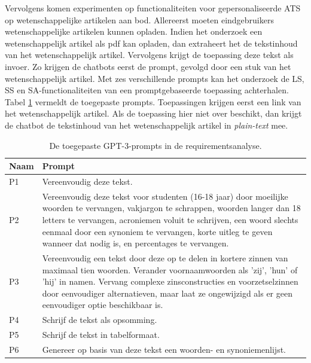 Vervolgens komen experimenten op functionaliteiten voor gepersonaliseerde ATS op wetenschappelijke artikelen aan bod. Allereerst moeten eindgebruikers wetenschappelijke artikelen kunnen opladen. Indien het onderzoek een wetenschappelijk artikel als pdf kan opladen, dan extraheert het de tekstinhoud van het wetenschappelijk artikel. Vervolgens krijgt de toepassing deze tekst als invoer. Zo krijgen de chatbots eerst de prompt, gevolgd door een stuk van het wetenschappelijk artikel. Met zes verschillende prompts kan het onderzoek de LS, SS en SA-functionaliteiten van een promptgebaseerde toepassing achterhalen. Tabel \ref{table:tested-prompts-requirementsanalysis} vermeldt de toegepaste prompts. Toepassingen krijgen eerst een link van het wetenschappelijk artikel. Als de toepassing hier niet over beschikt, dan krijgt de chatbot de tekstinhoud van het wetenschappelijk artikel in \textit{plain-text} mee. 

\begin{center}
	\begin{table}[H]
		\begin{tabular}{ | m{2cm} | m{14cm} | } 
			\hline
			\textbf{Naam} & \textbf{Prompt} \\
			\hline
			P1 & Vereenvoudig deze tekst. \\
			\hline
			P2 & Vereenvoudig deze tekst voor studenten (16-18 jaar) door moeilijke woorden te vervangen, vakjargon te schrappen, woorden langer dan 18 letters te vervangen, acroniemen voluit te schrijven, een woord slechts eenmaal door een synoniem te vervangen, korte uitleg te geven wanneer dat nodig is, en percentages te vervangen. \\
			\hline
			P3 & Vereenvoudig een tekst door deze op te delen in kortere zinnen van maximaal tien woorden. Verander voornaamwoorden als 'zij', 'hun' of 'hij' in namen. Vervang complexe zinsconstructies en voorzetselzinnen door eenvoudiger alternatieven, maar laat ze ongewijzigd als er geen eenvoudiger optie beschikbaar is. \\
			\hline
			P4 & Schrijf de tekst als opsomming. \\
			\hline
			P5 & Schrijf de tekst in tabelformaat. \\
			\hline
			P6 & Genereer op basis van deze tekst een woorden- en synoniemenlijst. \\
			\hline
		\end{tabular}
		\caption{De toegepaste GPT-3-prompts in de requirementsanalyse.}
		\label{table:tested-prompts-requirementsanalysis}
	\end{table}
\end{center}

